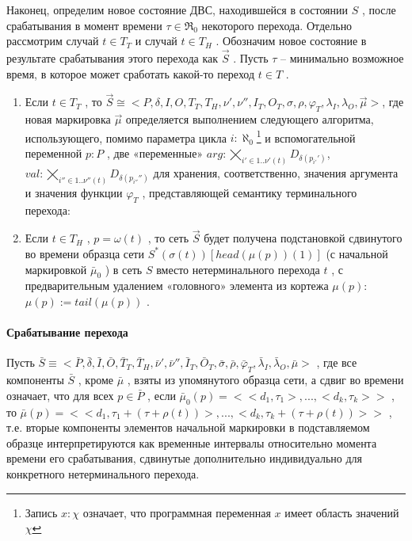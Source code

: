 		Наконец, определим новое состояние ДВС, находившейся в состоянии $ S $  , 
		после срабатывания в момент времени   $ \tau \in \Re_0 $  некоторого перехода. 
		Отдельно рассмотрим случай  $ t\in T_T $   и случай  $ t\in T_H $ . 
		Обозначим новое состояние в результате срабатывания этого перехода как  $ \vec{S} $ . 
		Пусть $ \tau $   -- минимально возможное время, в которое может сработать какой-то переход $ t\in T $  .
		\begin{enumerate}
			\item Если  $ t\in T_T $ , то
			$ \vec{S}\cong<P,\delta,I,O,T_T,T_H,\nu',\nu'',I_T,O_T,\sigma,\rho,\varphi_T,\lambda_I,\lambda_O,\vec{\mu} >$, 
			где новая маркировка $ \vec{\mu} $  определяется выполнением следующего алгоритма, использующего, 
			помимо параметра цикла $ i:\aleph_0$\footnote{Запись $x:\chi$ означает, что программная переменная $x$ имеет область значений $\chi$}   и вспомогательной переменной $ p:P $  , 
			две «переменные»  $ arg:\displaystyle\bigtimes_{i'\in 1..\nu'(t)}D_{\delta(p_{i'}')} $, 
			$ val: \displaystyle\bigtimes_{i''\in 1..\nu''(t)} D_{\delta(p_{i''}'')} $  
			для хранения, соответственно, значения аргумента и значения функции $ \varphi_T $  , представляющей семантику терминального перехода:\\
			
			

			\item Если $ t\in T_H $  , $ p=\omega(t) $ , то сеть $ \vec{S} $    
			будет получена подстановкой сдвинутого во времени образца сети  $ S^*(\sigma(t))[head(\mu(p))(1)] $   
			(с начальной маркировкой  $ \bar{\mu}_0 $ ) в сеть $ S $    вместо нетерминального перехода $ t $ , 
			с предварительным удалением «головного» элемента из кортежа $ \mu(p) $: $ \mu(p):=tail(\mu(p)) $ .
		\end{enumerate}
	\paragraph{Срабатывание перехода}		
		Пусть  $ \bar{S}\equiv<\bar{P},\bar{\delta},\bar{I},\bar{O},
		\bar{T}_T,\bar{T}_H,\bar{\nu}',\bar{\nu}'',\bar{I}_T,\bar{O}_T,\bar{\sigma},
		\bar{\rho},\bar{\varphi}_T,\bar{\lambda}_I,\bar{\lambda}_O,\bar{\mu}> $ , где все компоненты $ \bar{S} $   , кроме $ \bar{\mu} $  ,
		взяты из упомянутого образца сети, а сдвиг во времени означает, что для всех  $ p\in \bar{P} $ ,  
		если \( \bar{\mu}_0(p)=<<d_1,\tau_1>,...,<d_k,\tau_k>>\) , то $ \bar{\mu}(p)=<<d_1,\tau_1+(\tau+\rho(t))>,...,<d_k,\tau_k+(\tau+\rho(t))>> $  , 
		т.е. вторые компоненты элементов начальной маркировки в подставляемом образце интерпретируются как временные интервалы 
		относительно момента времени его срабатывания, сдвинутые дополнительно индивидуально для конкретного нетерминального перехода. 
		
